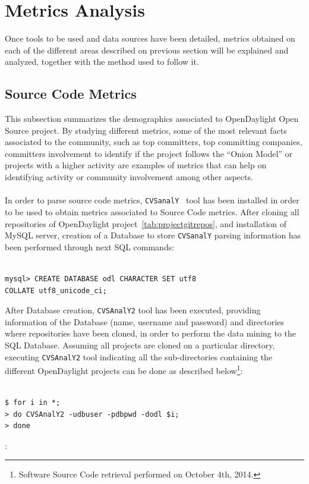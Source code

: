 \documentclass[a4paper, 12pt]{book}
\begin{document}
\section{Metrics Analysis}
\label{sec:odl_metrics_analysis}
Once tools to be used and data sources have been detailed, metrics obtained on each of the different areas described on previous section will be explained and analyzed, together with the method used to follow it.

\subsection{Source Code Metrics}
\label{subsec:odl_metrics_source_code}
This subsection summarizes the demographics associated to OpenDaylight Open Source project. By studying different metrics, some of the most relevant facts associated to the community, such as top committers, top committing companies, committers involvement to identify if the project follows the ``Onion Model'' or projects with a higher activity are examples of metrics that can help on identifying activity or community involvement among other aspects.\\
\\
In order to parse source code metrics, \texttt{CVSanalY}~\cite{CVSAnalY} tool has been installed in order to be used to obtain metrics associated to Source Code metrics. After cloning all repositories of OpenDaylight project~\ref{tab:projectgitrepos}, and installation of MySQL server, creation of a Database to store \texttt{CVSanalY} parsing information has been performed through next SQL commands:
\begin{verbatim}

mysql> CREATE DATABASE odl CHARACTER SET utf8
COLLATE utf8_unicode_ci;

\end{verbatim}
After Database creation, \texttt{CVSAnalY2} tool has been executed, providing information of the Database (name, username and password) and directories where repositories have been cloned, in order to perform the data mining to the SQL Database. Assuming all projects are cloned on a particular directory, executing \texttt{CVSAnalY2} tool indicating all the sub-directories containing the different OpenDaylight projects can be done as described below\footnote{Software Source Code retrieval performed on October 4th, 2014.}:
\begin{verbatim}

$ for i in *;
> do CVSAnalY2 -udbuser -pdbpwd -dodl $i;
> done

\end{verbatim}
:
\end{document}
